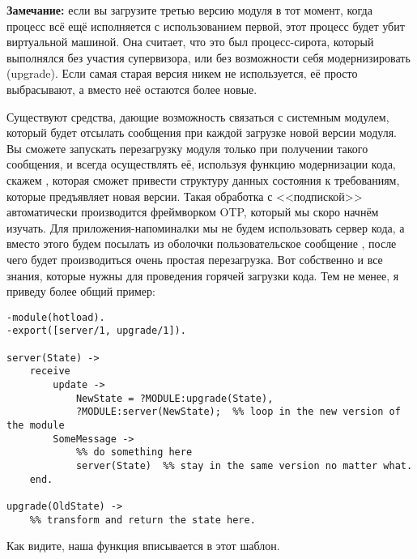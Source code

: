 \colorbox{lgray}
{
\begin{minipage}{1.0\linewidth}
    \textbf{Замечание:} если вы загрузите третью версию модуля в тот момент, когда процесс всё ещё исполняется с использованием первой, этот процесс будет убит виртуальной машиной.
    Она считает, что это был процесс\--сирота, который выполнялся без участия супервизора, или без возможности себя модернизировать (upgrade). 
    Если самая старая версия никем не используется, её просто выбрасывают, а вместо неё остаются более новые.
\end{minipage}
}

Существуют средства, дающие возможность связаться с системным модулем, который будет отсылать сообщения при каждой загрузке новой версии модуля.
Вы сможете запускать перезагрузку модуля только при получении такого сообщения, и всегда осуществлять её, используя функцию модернизации кода, скажем , которая сможет привести структуру данных состояния к требованиям, которые предъявляет новая версии.
Такая обработка с <<подпиской>> автоматически производится фреймворком OTP, который мы скоро начнём изучать.
Для приложения\--напоминалки мы не будем использовать сервер кода, а вместо этого будем посылать из оболочки пользовательское сообщение , после чего будет производиться очень простая перезагрузка.
Вот собственно и все знания, которые нужны для проведения горячей загрузки кода.
Тем не менее, я приведу более общий пример:
\begin{lstlisting}[style=erlang]
-module(hotload).
-export([server/1, upgrade/1]).
 
server(State) ->
    receive
        update ->
            NewState = ?MODULE:upgrade(State),
            ?MODULE:server(NewState);  %% loop in the new version of the module
        SomeMessage ->
            %% do something here
            server(State)  %% stay in the same version no matter what.
    end.
 
upgrade(OldState) ->
    %% transform and return the state here.
\end{lstlisting}

Как видите, наша функция  вписывается в этот шаблон.
